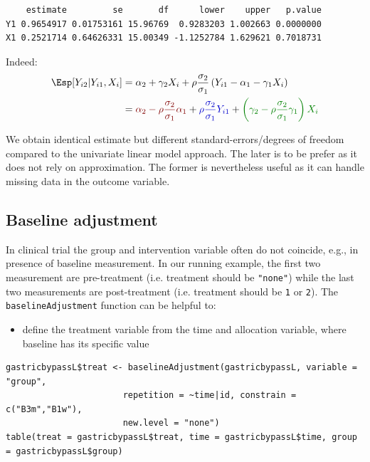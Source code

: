 \documentclass[12pt]{article}
\newcommand{\darkblue}{blue!80!black}
\newcommand{\darkgreen}{green!50!black}
\newcommand{\darkred}{red!50!black}
\begin{document}
\begin{verbatim}
    estimate         se       df      lower    upper   p.value
Y1 0.9654917 0.01753161 15.96769  0.9283203 1.002663 0.0000000
X1 0.2521714 0.64626331 15.00349 -1.1252784 1.629621 0.7018731
\end{verbatim}


Indeed:
\begin{align*}
\Esp[Y_{i2}|Y_{i1},X_{i}] &= \alpha_2 + \gamma_2 X_{i} + \rho \frac{\sigma_2}{\sigma_1}\left(Y_{i1} - \alpha_1 - \gamma_1 X_{i}\right) \\
                         &= \textcolor{\darkred}{\alpha_2 - \rho \frac{\sigma_2}{\sigma_1} \alpha_1}
                         + \textcolor{\darkblue}{\rho \frac{\sigma_2}{\sigma_1}Y_{i1}}
                         + \textcolor{\darkgreen}{\left(\gamma_2 - \rho \frac{\sigma_2}{\sigma_1} \gamma_1\right)  X_{i} }
\end{align*}

We obtain identical estimate but different standard-errors/degrees of
freedom compared to the univariate linear model approach. The later is
to be prefer as it does not rely on approximation. The former is
nevertheless useful as it can handle missing data in the outcome
variable.

\clearpage

\subsection{Baseline adjustment}
\label{sec:orgf420fcd}

In clinical trial the group and intervention variable often do not
coincide, e.g., in presence of baseline measurement. In our running
example, the first two measurement are pre-treatment (i.e. treatment
should be \texttt{"none"}) while the last two measurements are post-treatment
(i.e. treatment should be \texttt{1} or \texttt{2}). The \texttt{baselineAdjustment}
function can be helpful to:
\begin{itemize}
\item define the treatment variable from the time and allocation variable, where baseline has its specific value
\end{itemize}
\lstset{language=r,label= ,caption= ,captionpos=b,numbers=none}
\begin{lstlisting}
gastricbypassL$treat <- baselineAdjustment(gastricbypassL, variable = "group",
					   repetition = ~time|id, constrain = c("B3m","B1w"),
					   new.level = "none")
table(treat = gastricbypassL$treat, time = gastricbypassL$time, group = gastricbypassL$group)
\end{lstlisting}
\end{document}
